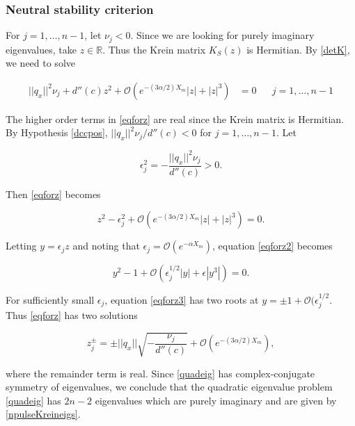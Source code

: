 \documentclass[12pt]{article}
\def\R{{\mathbb R}}
\begin{document}
\subsubsection{Neutral stability criterion}

For $j = 1, \dots, n-1$, let $\nu_j < 0$. Since we are looking for purely imaginary eigenvalues, take $z \in \R$. Thus the Krein matrix $K_S(z)$ is Hermitian. By \eqref{detK}, we need to solve

\begin{align}\label{eqforz}
||q_x||^2 \nu_j + d''(c) z^2 + \mathcal{O}(e^{-(3 \alpha/2) X_m}|z| + |z|^3) &= 0 && j = 1, \dots, n-1
\end{align}

The higher order terms in \eqref{eqforz} are real since the Krein matrix is Hermitian. By Hypothesis \ref{dccpos}, $||q_x||^2 \nu_j / d''(c) < 0$ for $j = 1, \dots, n-1$. Let

\begin{equation}\label{epsilon2}
\epsilon_j^2 = -\frac{||q_x||^2 \nu_j}{d''(c)} > 0.
\end{equation}

Then \eqref{eqforz} becomes

\begin{equation}\label{eqforz2}
z^2 - \epsilon_j^2 + \mathcal{O}(e^{-(3 \alpha/2) X_m}|z| + |z|^3) = 0.
\end{equation}

Letting $y = \epsilon_j z$ and noting that $\epsilon_j = \mathcal{O}(e^{-\alpha X_m})$, equation \eqref{eqforz2} becomes

\begin{equation}\label{eqforz3}
y^2 - 1 + \mathcal{O}(\epsilon_j^{1/2 }|y| + \epsilon|y^3|) = 0.
\end{equation}

For sufficiently small $\epsilon_j$, equation \eqref{eqforz3} has two roots at $y = \pm 1 + \mathcal{O}(\epsilon_j^{1/2}$. Thus \eqref{eqforz} has two solutions

\begin{equation}
z_j^\pm = \pm ||q_x|| \sqrt{ -\frac{ \nu_j}{d''(c)} } + \mathcal{O}(e^{-(3 \alpha/2) X_m}),
\end{equation}

where the remainder term is real. Since \eqref{quadeig} has complex-conjugate symmetry of eigenvalues, we conclude that the quadratic eigenvalue problem \eqref{quadeig} has $2n - 2$ eigenvalues which are purely imaginary and are given by \eqref{npulseKreineigs}.
\end{document}
